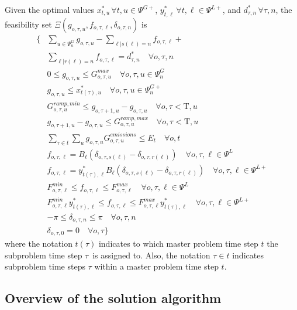 \documentclass[final]{IEEEtran}
\newcommand{\Tau}{\mathrm{T}}
\begin{document}
Given the optimal values $x_{t, u}^* \, \forall t, u \in \Psi^{G+}$, $y_{t, \ell}^* \, \forall t, \ell \in \Psi^{L+}$, and $d_{\tau, n}^* \, \forall \tau, n$, the feasibility set $\Xi(g_{o, \tau, u}, f_{o, \tau, \ell}, \delta_{o, \tau, n})$ is
\begin{align}
\{ &\sum\limits_{u \in \Psi^G_{n}} g_{o, \tau, u} - \sum\limits_{\ell | s(\ell) = n} f_{o, \tau, \ell} + \nonumber \\
&\sum\limits_{\ell | r(\ell) = n} f_{o, \tau, \ell} = d_{\tau, n}^* \quad \forall o, \tau, n\\
&0 \leq g_{o, \tau, u} \leq G_{o, \tau, u}^{max} \quad \forall o, \tau, u \in \Psi_n^G \\
&g_{o, \tau, u} \leq x_{t(\tau), u}^* \quad \forall o, \tau, u \in \Psi_n^{G+} \\
&G^{ramp,min}_{o, \tau, u} \leq g_{o, \tau + 1, u} - g_{o, \tau, u} \quad \forall o, \tau < \Tau, u \\
&g_{o, \tau + 1, u} - g_{o, \tau, u} \leq G^{ramp,max}_{o, \tau, u} \quad \forall o, \tau < \Tau, u \\
&\sum\limits_{\tau \in t} \sum\limits_{u} g_{o, \tau, u} G^{emissions}_{o, \tau, u} \leq E_{t} \quad \forall o, t \\
&f_{o, \tau, \ell} = B_\ell (\delta_{o, \tau, s(\ell)} - \delta_{o, \tau, r(\ell)}) \quad \forall o, \tau, \ell \in \Psi^L \\
&f_{o, \tau, \ell} = y_{t(\tau), \ell}^* B_\ell (\delta_{o, \tau, s(\ell)} - \delta_{o, \tau, r(\ell)}) \quad \forall o, \tau, \ell \in \Psi^{L+} \\
&F_{o, \tau, \ell}^{min} \leq f_{o, \tau, \ell} \leq F_{o, \tau, \ell}^{max} \quad \forall o, \tau, \ell \in \Psi^L \\
&F_{o, \tau, \ell}^{min} y_{t(\tau), \ell}^* \leq f_{o, \tau, \ell} \leq F_{o, \tau, \ell}^{max} y_{t(\tau), \ell}^* \quad \forall o, \tau, \ell \in \Psi^{L+} \\
&-\pi \leq \delta_{o, \tau, n} \leq \pi \quad \forall o, \tau, n \\
&\delta_{o, \tau, 0} = 0 \quad \forall o, \tau \}
\end{align}
where the notation $t(\tau)$ indicates to which master problem time step $t$ the subproblem time step $\tau$ is assigned to. Also, the notation $\tau \in t$ indicates subproblem time steps $\tau$ within a master problem time step $t$.

\subsection{Overview of the solution algorithm}
\end{document}
